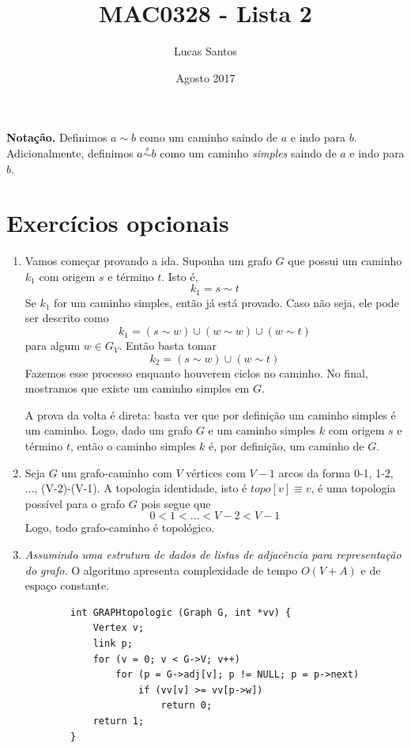\documentclass[12pt,letterpaper]{article}
\title{MAC0328 - Lista 2}
\author{Lucas Santos}
\date{Agosto 2017}
\begin{document}
\maketitle

\textbf{Notação.} Definimos $a \sim b$ como um caminho saindo de $a$ e indo para $b$. Adicionalmente, definimos $a \stackrel{s}{\sim} b$ como um caminho \textit{simples} saindo de $a$ e indo para $b$.

\section {Exercícios opcionais}

\begin{enumerate}
    \item Vamos começar provando a ida. Suponha um grafo $G$ que possui um caminho $k_1$ com origem $s$ e término $t$. Isto é,
    $$ k_1 = s \sim t$$
    Se $k_1$ for um caminho simples, então já está provado. Caso não seja, ele pode ser descrito como
    $$ k_1 = (s \sim w) \cup (w \sim w) \cup (w \sim t)$$
    para algum $w \in G_V$. Então basta tomar
    $$ k_2 = (s \sim w) \cup (w \sim t) $$
    Fazemos esse processo enquanto houverem ciclos no caminho. No final, mostramos que existe um caminho simples em $G$.

    A prova da volta é direta: basta ver que por definição um caminho simples é um caminho. Logo, dado um grafo $G$ e um caminho simples $k$ com origem $s$ e término $t$, então o caminho simples $k$ é, por definição, um caminho de $G$.

    \item Seja $G$ um grafo-caminho com $V$ vértices com $V-1$ arcos da forma 0-1, 1-2, ..., (V-2)-(V-1). A topologia identidade, isto é $topo[v] \equiv v$, é uma topologia possível para o grafo $G$ pois segue que
    $$ 0 < 1 < ... < V-2 < V-1 $$
    Logo, todo grafo-caminho é topológico.

    \item \textit{Assumindo uma estrutura de dados de listas de adjacência para representação do grafo.} O algoritmo apresenta complexidade de tempo $O(V+A)$ e de espaço constante.
    \begin{lstlisting}
        int GRAPHtopologic (Graph G, int *vv) {
            Vertex v;
            link p;
            for (v = 0; v < G->V; v++)
                for (p = G->adj[v]; p != NULL; p = p->next)
                    if (vv[v] >= vv[p->w])
                        return 0;
            return 1;
        }
    \end{lstlisting}


\end{enumerate}
\end{document}
